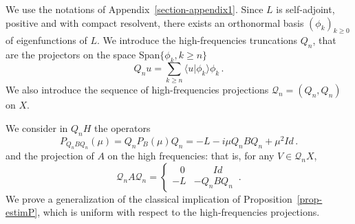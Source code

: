 \documentclass[AHL,Unicode,longabstracts]{cedram}
\newcommand{\Qc}{\mathcal{Q}}
\begin{document}
We use the notations of Appendix~\ref{section-appendix1}. Since $L$ is self-adjoint, positive and with compact resolvent, there exists an orthonormal basis $(\phi_k)_{k\geq 0}$ of eigenfunctions of $L$. We introduce the high-frequencies truncations $Q_n$, that are the projectors on the space Span$\{\phi_k,k\geq n\}$
\[
Q_nu=\sum_{k\geq n} \langle u | \phi_k\rangle \phi_k\,.
\]
We also introduce the sequence of high-frequencies projections $\Qc_n=(Q_n,Q_n)$ on $X$.

We consider in $Q_n H$ the operators
\[
P_{Q_n B Q_n}(\mu)=Q_nP_B(\mu)Q_n= - L -i\mu Q_nBQ_n + \mu^2 Id\,.
\]
and the projection of $A$ on the high frequencies: that is, for any $V\in\Qc_n X$,
\[
\Qc_n A \Qc_n =
\begin{cases}
\;\;\; 0 & \qquad Id \\
-L & -Q_n B Q_n
\end{cases}\,.
\]
We prove a generalization of the classical implication of Proposition~\ref{prop-estimP}, which is uniform with respect to the high-frequencies projections.
\end{document}
